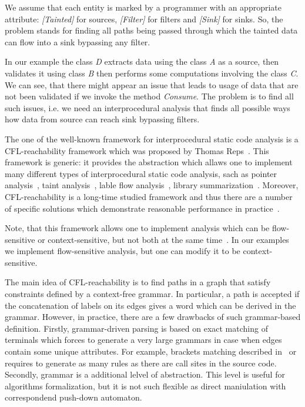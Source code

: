 We assume that each entity is marked by a programmer with an appropriate attribute: \textit{[Tainted]} for sources, \textit{[Filter]} for filters and \textit{[Sink]} for sinks.
So, the problem stands for finding all paths being passed through which the tainted data can flow into a sink bypassing any filter.

In our example the class \textit{D} extracts data using the class \textit{A} as a source, then validates it using class \textit{B} then performs some computations involving the class \textit{C}.
We can see, that there might appear an issue that leads to usage of data that are not been validated if we invoke the method \textit{Consume}.
The problem is to find all such issues, i.e. we need an interprocedural analysis that finds all possible ways how data from source can reach sink bypassing filters.

The one of the well-known framework for interprocedural static code analysis is a CFL-reachability framework which was proposed by Thomas Reps~\cite{Reps}.
This framework is generic: it provides the abstraction which allaws one to implement many different types of interprocedural static code analysis, sach as pointer analysis~\cite{Zheng, JavaCFL}, taint analysis~\cite{Huang:2015:SPT:2771783.2771803}, lable flow analysis~\cite{10.1007/11823230_7,CFLr}, library summarization~\cite{10.1007/978-3-662-54434-1_33}.
Moreover, CFL-reachability is a long-time studied framework and thus there are a number of specific solutions which demonstrate reasonable performance in practice~\cite{Wang:2017:GSD:3093315.3037744}.

Note, that this framework allows one to implement analysis which can be flow-sensitive or context-sensitive, but not both at the same time~\cite{Reps:2000:UCD:345099.345137}. In our examples we implement flow-sensitive analysis, but one can modify it to be context-sensitive.

The main idea of CFL-reachability is to find paths in a graph that satisfy constraints defined by a context-free grammar.
In particular, a path is accepted if the concatenation of labels on its edges gives a word which can be derived in the grammar.
However, in practice, there are a few drawbacks of such grammar-based definition.
Firstly, grammar-driven parsing is based on exact matching of terminals which forces to generate a very large grammars in case when edges contain some unique attributes.
For example, brackets matching described in~\cite{CFLr} or~\cite{Zheng, JavaCFL} requires to generate as many rules as there are call sites in the source code.
Secondly, grammar is a additional lelvel of abstraction.
This level is useful for algorithms formalization, but it is not such flexible as direct maniulation with correspondend push-down automaton.

